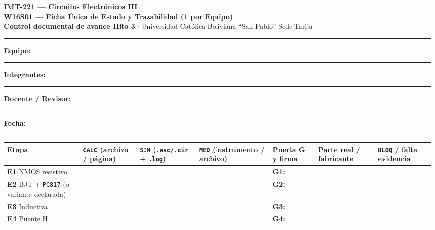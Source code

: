 \documentclass[10pt, a4paper, landscape]{article}
\begin{document}
\pagestyle{empty}

\noindent
{\LARGE \textbf{\textcolor{ucbblue}{IMT-221 — Circuitos Electrónicos III}}}\\[0.1cm]
{\Large \textbf{W16S01 — Ficha Única de Estado y Trazabilidad (1 por Equipo)}}\\[0.08cm]
{\small \textbf{Control documental de avance Hito 3} $\cdot$ Universidad Católica Boliviana ``San Pablo'' Sede Tarija}
\par\vspace{0.12cm}\noindent\rule{\linewidth}{0.6pt}\vspace{0.16cm}

\noindent
\textbf{Equipo:} \rule{3.2cm}{0.4pt} \quad
\textbf{Integrantes:} \rule{9.8cm}{0.4pt} \quad
\textbf{Docente / Revisor:} \rule{4.4cm}{0.4pt} \quad
\textbf{Fecha:} \rule{2.4cm}{0.4pt}

\vspace{0.16cm}
\noindent
{}

\par\vspace{0.18cm}\noindent
\renewcommand{\arraystretch}{1.25}
{\footnotesize
\begin{tabularx}{\linewidth}{|>{\raggedright\arraybackslash}p{3.0cm}|>{\raggedright\arraybackslash}X|>{\raggedright\arraybackslash}X|>{\raggedright\arraybackslash}X|>{\raggedright\arraybackslash}p{3.2cm}|>{\raggedright\arraybackslash}p{3.5cm}|>{\raggedright\arraybackslash}X|}
\hline
\rowcolor{ucbgray}
\textbf{Etapa} & \textbf{\texttt{CALC} (archivo / página)} & \textbf{\texttt{SIM} (\texttt{.asc/.cir} + \texttt{.log})} & \textbf{\texttt{MED} (instrumento / archivo)} & \textbf{Puerta G y firma} & \textbf{Parte real / fabricante} & \textbf{\texttt{BLOQ} / falta evidencia} \\ \hline
\textbf{E1} NMOS resistivo \rule{0pt}{1.35cm} & & & & \textbf{G1:} & & \\ \hline
\textbf{E2} BJT + \texttt{PC817} (o variante declarada) \rule{0pt}{1.35cm} & & & & \textbf{G2:} & & \\ \hline
\textbf{E3} Inductiva \rule{0pt}{1.35cm} & & & & \textbf{G3:} & & \\ \hline
\textbf{E4} Puente H \rule{0pt}{1.35cm} & & & & \textbf{G4:} & & \\ \hline
\end{tabularx}
}
\end{document}
